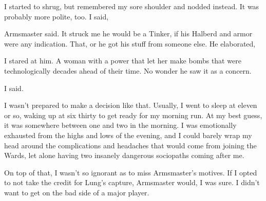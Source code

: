 

I started to shrug, but remembered my sore shoulder and nodded instead. It was probably more polite, too. I said, 

 Armsmaster said. It struck me he would be a Tinker, if his Halberd and armor were any indication. That, or he got his stuff from someone else. He elaborated, 

I stared at him. A woman with a power that let her make bombs that were technologically decades ahead of their time. No wonder he saw it as a concern.


 I said.


I wasn't prepared to make a decision like that. Usually, I went to sleep at eleven or so, waking up at six thirty to get ready for my morning run. At my best guess, it was somewhere between one and two in the morning. I was emotionally exhausted from the highs and lows of the evening, and I could barely wrap my head around the complications and headaches that would come from joining the Wards, let alone having two insanely dangerous sociopaths coming after me.

On top of that, I wasn't so ignorant as to miss Armsmaster's motives. If I opted to not take the credit for Lung's capture, Armsmaster would, I was sure. I didn't want to get on the bad side of a major player.

